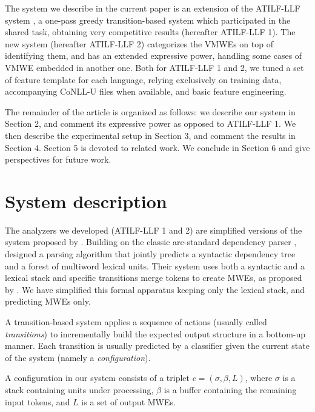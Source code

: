 \documentclass[output=paper,modfonts]{langscibook}
\begin{document}
The system we describe in the current paper is an extension of the ATILF-LLF system \citep{W17-1717}, a one-pass greedy transition-based system which participated in the shared task, obtaining very competitive results (hereafter ATILF-LLF 1). The new system (hereafter ATILF-LLF 2) categorizes the VMWEs on top of identifying them, and has an extended expressive power, handling some cases of VMWE embedded in another one. Both for ATILF-LLF 1 and 2, we tuned a set of feature template for each language, relying exclusively on training data, accompanying CoNLL-U files when available, and basic feature engineering.

The remainder of the article is organized as follows: we describe our system in Section 2, and comment its expressive power as opposed to ATILF-LLF 1. We then describe the experimental setup in Section 3, and comment the results in Section 4. Section 5 is devoted to related work. We conclude in Section 6 and give perspectives for future work. 

\section{System description}

The analyzers we developed (ATILF-LLF 1 and 2) are simplified versions of the system proposed by \citet{constant-nivre:acl:2016}. Building on the classic arc-standard dependency parser \citep{nivre04acl}, \citet{constant-nivre:acl:2016} designed a parsing algorithm that jointly predicts a syntactic dependency tree and a forest of multiword lexical units. Their system uses both a syntactic and a lexical stack and specific transitions merge tokens to create MWEs, as proposed by \citet{Nivre14}. We have simplified this formal apparatus keeping only the lexical stack, and predicting MWEs only.

A transition-based system applies a sequence of actions (usually called \emph{transitions}) to incrementally build the expected output structure in a bottom-up manner. Each transition is usually predicted by a classifier given the current state of the system (namely a \emph{configuration}).

A configuration in our system consists of a triplet $c = (\sigma, \beta, L)$, where $\sigma$ is a stack containing units under processing, $\beta$ is a buffer containing the remaining input tokens, and $L$ is a set of output MWEs.
\end{document}

